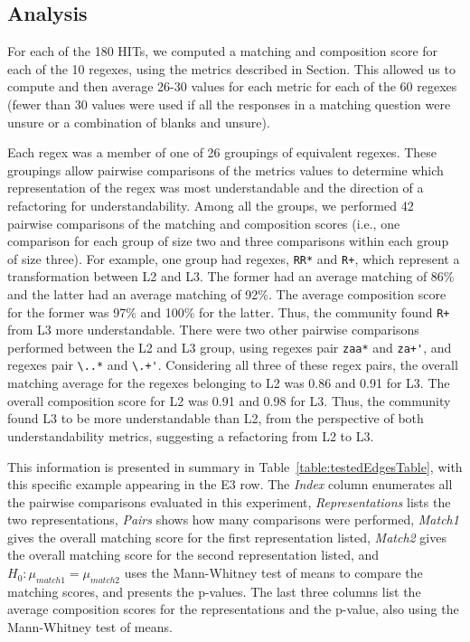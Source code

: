 


\subsection{Analysis}
For each of the 180 HITs, we computed a matching and composition score for each of the 10 regexes, using the metrics described in Section. This allowed us to compute and then average 26-30 values for each metric  for each of the 60 regexes (fewer than 30 values were used if all the responses in a matching question were unsure or a combination of blanks and unsure).

Each regex was a member of one of 26 groupings of equivalent regexes.
These groupings allow pairwise comparisons of the metrics values to determine which representation of the regex was most understandable and the direction of a refactoring for understandability.
Among all the groups, we performed 42 pairwise comparisons of the matching and composition scores  (i.e., one comparison for each group of size two and three comparisons within each group of size three).
For example, one group had regexes, \verb!RR*! and \verb!R+!, which  represent a transformation between L2 and L3. The former had an average matching of 86\% and the latter had an average matching of 92\%. The average composition score for the former was 97\% and 100\% for the latter. Thus, the community found \verb!R+! from L3 more understandable.
There were two other pairwise comparisons performed between the L2 and L3 group, using regexes pair \verb!zaa*! and \verb!za+'!, and regexes pair \verb!\..*! and \verb!\.+'!.
Considering all three of these regex pairs, the overall matching average for the regexes belonging to L2 was 0.86 and 0.91 for L3.
The overall composition score for L2 was 0.91 and 0.98 for L3. Thus, the community found L3 to be more understandable than L2, from the perspective of both understandability metrics, suggesting a refactoring from L2 to L3.

This information is presented in summary in Table~\ref{table:testedEdgesTable}, with this specific example appearing in the E3 row. The \emph{Index} column enumerates all the pairwise comparisons evaluated in this experiment, \emph{Representations} lists the two representations, \emph{Pairs} shows how many comparisons were performed, \emph{Match1} gives the overall matching score for the first representation listed, \emph{Match2} gives the overall matching score for the second representation listed, and $H_0: \mu_{match1} = \mu_{match2}$ uses the Mann-Whitney test of means to compare the matching scores, and presents the p-values. The last three columns list the average composition scores for the representations and the p-value, also using the Mann-Whitney test of means.

